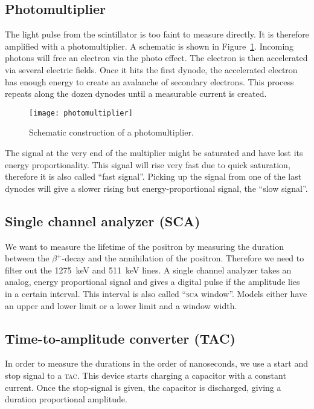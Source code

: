 \documentclass[11pt, english, fleqn, DIV=15, headinclude, BCOR=2cm]{scrreprt}
\begin{document}
\subsection{Photomultiplier}

The light pulse from the scintillator is too faint to measure directly. It is
therefore amplified with a photomultiplier. A schematic is shown in
Figure~\ref{fig:photomultiplier}. Incoming photons will free an electron via
the photo effect. The electron is then accelerated via several electric fields.
Once it hits the first dynode, the accelerated electron has enough energy to
create an avalanche of secondary electrons. This process repeats along the
dozen dynodes until a measurable current is created.

\begin{figure}
    \centering
    \texttt{[image: photomultiplier]}
    \caption{%
        Schematic construction of a photomultiplier.
    }
    \label{fig:photomultiplier}
\end{figure}

The signal at the very end of the multiplier might be saturated and have lost
its energy proportionality. This signal will rise very fast due to quick
saturation, therefore it is also called \enquote{fast signal}. Picking up the
signal from one of the last dynodes will give a slower rising but
energy-proportional signal, the \enquote{slow signal}.

\subsection{Single channel analyzer (SCA)}

We want to measure the lifetime of the positron by measuring the duration
between the $\beta^+$-decay and the annihilation of the positron. Therefore we
need to filter out the \SI{1275}{\kilo\electronvolt} and
\SI{511}{\kilo\electronvolt} lines. A single channel analyzer takes an analog,
energy proportional signal and gives a digital pulse if the amplitude lies in a
certain interval. This interval is also called \enquote{\textsc{sca} window}. Models
either have an upper and lower limit or a lower limit and a window width.

\subsection{Time-to-amplitude converter (TAC)}

In order to measure the durations in the order of nanoseconds, we use a start
and stop signal to a \textsc{tac}\@. This device starts charging a capacitor with a
constant current. Once the stop-signal is given, the capacitor is discharged,
giving a duration proportional amplitude.
\end{document}
